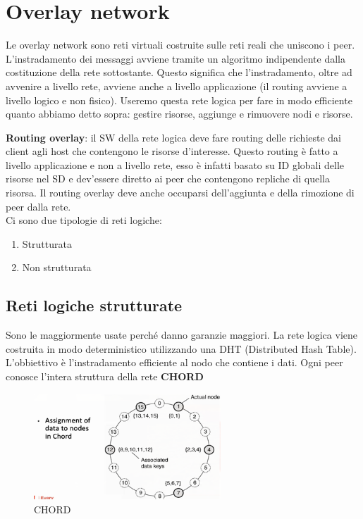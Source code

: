 \documentclass[12pt,italian]{report}
\begin{document}
\section{Overlay network}
Le overlay network sono reti virtuali costruite sulle reti reali che uniscono i peer. L'instradamento dei messaggi avviene tramite un algoritmo indipendente dalla costituzione della rete sottostante. Questo significa che l'instradamento, oltre ad avvenire a livello rete, avviene anche a livello applicazione (il routing avviene a livello logico e non fisico). Useremo questa rete logica per fare in modo efficiente quanto abbiamo detto sopra: gestire risorse, aggiunge e rimuovere nodi e risorse. 

\noindent \textbf{Routing overlay}: il SW della rete logica deve fare routing delle richieste dai client agli host che contengono le risorse d'interesse. Questo routing è fatto a livello applicazione e non a livello rete, esso è infatti basato su ID globali delle risorse nel SD e dev'essere diretto ai peer che contengono repliche di quella risorsa. Il routing overlay deve anche occuparsi dell'aggiunta e della rimozione di peer dalla rete. \\ Ci sono due tipologie di reti logiche:
\begin{enumerate}
    \item Strutturata
    \item Non strutturata
\end{enumerate}

\subsection{Reti logiche strutturate}
Sono le maggiormente usate perché danno garanzie maggiori. La rete logica viene costruita in modo deterministico utilizzando una DHT (Distributed Hash Table). L'obbiettivo è l'instradamento efficiente al nodo che contiene i dati. Ogni peer conosce l'intera struttura della rete
\bigbreak
\noindent \textbf{CHORD} 
\begin{figure}[h]
\centering
\includegraphics[width=70mm]{img/chord.png}
\caption{CHORD}
\label{fig:chord}
\end{figure}
\end{document}
